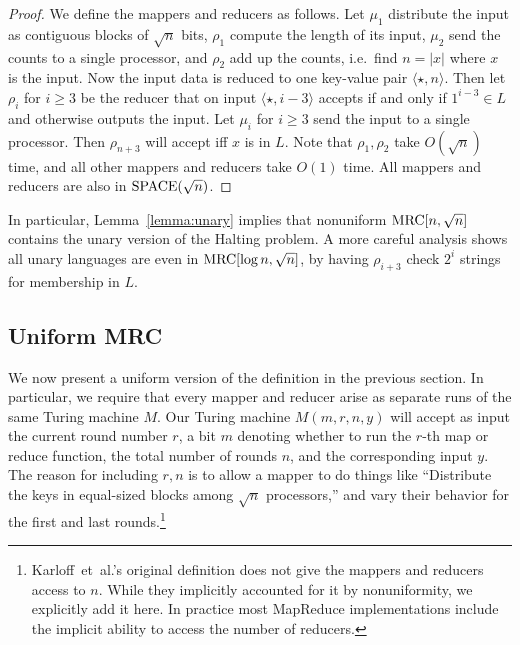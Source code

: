 \documentclass[11pt]{article}
\theoremstyle{definition}
\theoremstyle{remark}
\newcommand{\mrc}{\textup{MRC}}
\newcommand{\SPACE}{\textup{SPACE}}
\begin{document}
\begin{proof}
We define the mappers and reducers as follows. Let $\mu_1$ distribute the input
as contiguous blocks of $\sqrt{n}$ bits, $\rho_1$ compute the length of its
input, $\mu_2$ send the counts to a single processor, and $\rho_2$ add up the
counts, i.e.\ find $n=|x|$ where $x$ is the input. Now the input data is
reduced to one key-value pair $\langle \star, n \rangle$. Then let $\rho_i$ for
$i \ge 3$ be the reducer that on input $\langle \star, i-3 \rangle$ accepts if
and only if $1^{i-3} \in L$ and otherwise outputs the input. Let $\mu_i$ for $i
\ge 3$ send the input to a single processor. Then $\rho_{n+3}$ will accept iff
$x$ is in $L$. Note that $\rho_1, \rho_2$ take $O(\sqrt{n})$ time, and all
other mappers and reducers take $O(1)$ time. All mappers and reducers are also
in $\SPACE(\sqrt{n})$. \end{proof}

In particular, Lemma~\ref{lemma:unary} implies that nonuniform $\mrc[n,
\sqrt{n}]$ contains the unary version of the Halting problem. A more careful
analysis shows all unary languages are even in $\mrc[\log n, \sqrt{n}]$, by
having $\rho_{i+3}$ check $2^i$ strings for membership in $L$.

\subsection{Uniform MRC}\label{sec:uniform}

We now present a uniform version of the definition in the previous section. In
particular, we require that every mapper and reducer arise as separate runs of
the same Turing machine $M$. Our Turing machine $M(m, r, n, y)$ will accept as
input the current round number $r$, a bit $m$ denoting whether to run the
$r$-th map or reduce function, the total number of rounds $n$, and the
corresponding input $y$. The reason for including $r, n$ is to allow a mapper
to do things like ``Distribute the keys in equal-sized blocks among $\sqrt{n}$
processors,'' and vary their behavior for the first and last
rounds.\footnote{Karloff~et~al.'s original definition does not give the mappers
and reducers access to $n$. While they implicitly accounted for it by
nonuniformity, we explicitly add it here. In practice most MapReduce
implementations include the implicit ability to access the number of
reducers.}
\end{document}
